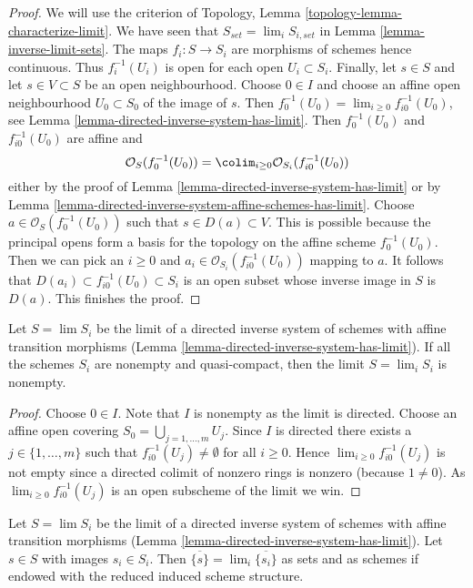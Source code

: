 \begin{proof}
We will use the criterion of
Topology, Lemma \ref{topology-lemma-characterize-limit}.
We have seen that $S_{set} = \lim_i S_{i, set}$ in
Lemma \ref{lemma-inverse-limit-sets}.
The maps $f_i : S \to S_i$ are morphisms of schemes
hence continuous. Thus $f_i^{-1}(U_i)$ is open for each
open $U_i \subset S_i$. Finally, 
let $s \in S$ and let $s \in V \subset S$ be an open
neighbourhood. Choose $0 \in I$ and choose an
affine open neighbourhood $U_0 \subset S_0$ of the image of $s$.
Then $f_0^{-1}(U_0) = \lim_{i \geq 0} f_{i0}^{-1}(U_0)$, see
Lemma \ref{lemma-directed-inverse-system-has-limit}.
Then $f_0^{-1}(U_0)$ and $f_{i0}^{-1}(U_0)$ are affine and
$$
\mathcal{O}_S(f_0^{-1}(U_0)) =
\colim_{i \geq 0} \mathcal{O}_{S_i}(f_{i0}^{-1}(U_0))
$$
either by the proof of
Lemma \ref{lemma-directed-inverse-system-has-limit}
or by
Lemma \ref{lemma-directed-inverse-system-affine-schemes-has-limit}.
Choose $a \in \mathcal{O}_S(f_0^{-1}(U_0))$ such that
$s \in D(a) \subset V$. This is possible because the principal
opens form a basis for the topology on the affine scheme $f_0^{-1}(U_0)$.
Then we can pick an $i \geq 0$ and
$a_i \in \mathcal{O}_{S_i}(f_{i0}^{-1}(U_0))$ mapping to $a$.
It follows that $D(a_i) \subset f_{i0}^{-1}(U_0) \subset S_i$
is an open subset whose inverse image in $S$ is $D(a)$.
This finishes the proof.
\end{proof}

\begin{lemma}
\label{lemma-limit-nonempty}
Let $S = \lim S_i$ be the limit of a directed inverse system
of schemes with affine transition morphisms
(Lemma \ref{lemma-directed-inverse-system-has-limit}).
If all the schemes $S_i$ are nonempty and quasi-compact,
then the limit $S = \lim_i S_i$ is nonempty.
\end{lemma}

\begin{proof}
Choose $0 \in I$. Note that $I$ is nonempty as the limit is directed.
Choose an affine open covering $S_0 = \bigcup_{j = 1, \ldots, m} U_j$.
Since $I$ is directed there exists a $j \in \{1, \ldots, m\}$
such that $f_{i0}^{-1}(U_j) \not = \emptyset$ for all
$i \geq 0$. Hence $\lim_{i \geq 0} f_{i0}^{-1}(U_j)$ is not
empty since a directed colimit of nonzero rings is nonzero
(because $1 \not = 0$). As $\lim_{i \geq 0} f_{i0}^{-1}(U_j)$
is an open subscheme of the limit we win.
\end{proof}

\begin{lemma}
\label{lemma-inverse-limit-irreducibles}
Let $S = \lim S_i$ be the limit of a directed inverse system
of schemes with affine transition morphisms
(Lemma \ref{lemma-directed-inverse-system-has-limit}).
Let $s \in S$ with images $s_i \in S_i$.
Then $\overline{\{s\}} = \lim_i \overline{\{s_i\}}$ as sets
and as schemes if endowed with the reduced induced scheme structure.
\end{lemma}

